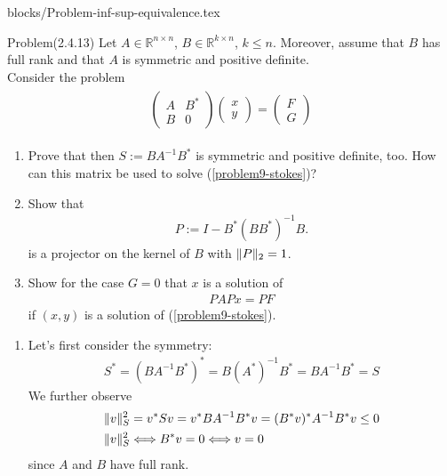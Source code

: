 

\clearpage




 {blocks/Problem-inf-sup-equivalence.tex}
\clearpage




\begin {blocktheorem}{Problem}(2.4.13)
Let $A\in\mathbb{R}^{n\times n}$, $B\in\mathbb{R}^{k\times n}$, $k\leq n$.
Moreover, assume that $B$ has full rank and that $A$ is symmetric and
positive definite.\\
Consider the problem
\begin{align}
\begin{aligned}
\begin{pmatrix} A & B^* \\ B & 0 \end{pmatrix}
\begin{pmatrix} x \\ y \end{pmatrix}
= \begin{pmatrix} F \\ G \end{pmatrix}
\end{aligned}
\tag{*}
\label{problem9-stokes}
\end{align}
\begin{enumerate}
\item Prove that then $S := BA^{-1}B^*$ is symmetric and positive definite, too.
How can this matrix be used to solve (\ref{problem9-stokes})?
\item Show that
\begin{align*}
 P := I - B^*(BB^*)^{-1}B.
\end{align*}
is a projector on the kernel of $B$ with $\lVert P\rVert_2=1$.
\item Show for the case $G = 0$ that $x$ is a solution of
\begin{align*}
PAPx = PF
\end{align*}
if $(x,y)$ is a solution of (\ref{problem9-stokes}).
\end{enumerate}
\begin{solution}
\begin{enumerate}
 \item Let's first consider the symmetry:
  \begin{align*}
    S^*=(BA^{-1}B^*)^*=B(A^*)^{-1}B^*=BA^{-1}B^*=S
  \end{align*}
  We further observe
  \begin{align*}
   \lVert v\rVert_S^2 &= v^*Sv = v^*BA^{-1}B^*v = (B^*v)^*A^{-1}B^*v \leq 0 \\
   \lVert v\rVert_S^2 &\Longleftrightarrow B^*v = 0 \Longleftrightarrow v=0
  \end{align*}
  since $A$ and $B$ have full rank.


\end{enumerate}
\end{solution}
\end{blocktheorem}
